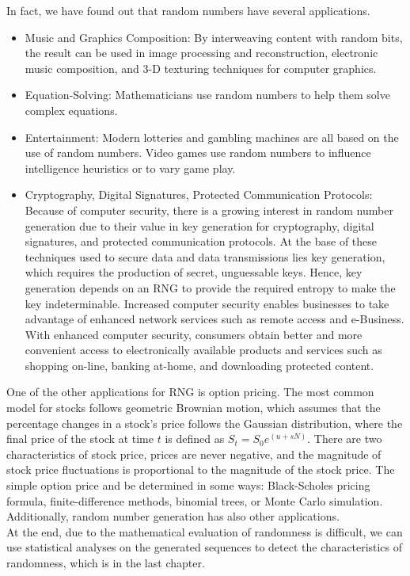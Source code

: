 \documentclass[a4paper,11pt]{article}
\begin{document}
In fact, we have found out that random numbers have several applications. 
\begin{itemize}
\item{Music and Graphics Composition: By interweaving content with random bits, the result can be used in image processing and reconstruction, electronic music composition, and 3-D texturing techniques for computer graphics.}
\item{Equation-Solving: Mathematicians use random numbers to help them solve complex equations.}
\item{Entertainment: Modern lotteries and gambling machines are all based on the use of random numbers. Video games use random numbers to influence intelligence heuristics or to vary game play. }
\item{Cryptography, Digital Signatures, Protected Communication Protocols: Because of computer security, there is a growing interest in random number generation due to their value in key generation for cryptography, digital signatures, and protected communication protocols. At the base of these techniques used to secure data and data transmissions lies key generation, which requires the production of secret, unguessable keys. Hence, key generation depends on an RNG to provide the required entropy to make the key indeterminable. Increased computer security enables businesses to take advantage of enhanced network services such as remote access and e-Business. With  enhanced computer security, consumers obtain better and more convenient access to electronically available products and services such as shopping on-line, banking at-home, and downloading protected content. }
\end{itemize}
One of the other applications for RNG is option pricing. The most common model for stocks follows geometric Brownian motion, which assumes that the percentage changes in a stock's price follows the Gaussian distribution, where the final price of the stock at time $t$ is defined as $S_t = S_0e^{(u+sN)}$. There are two characteristics of stock price, prices are never negative, and the magnitude of stock price fluctuations is proportional to the magnitude of the stock price. The simple option price and be determined in some ways: Black-Scholes pricing formula, finite-difference methods, binomial trees, or Monte Carlo simulation. Additionally, random number generation has also other applications.  \\ 

At the end, due to the mathematical evaluation of randomness is difficult, we can use statistical analyses on the generated sequences to detect the characteristics of randomness,
which is in the last chapter. 
\\
\end{document}
